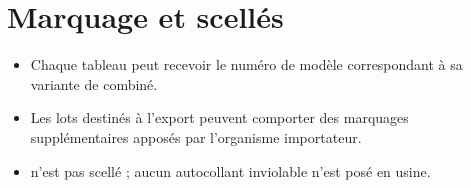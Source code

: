 \chapter{Marquage et scellés}\label{ch:marking}

\begin{itemize}
    \item Chaque tableau peut recevoir le numéro de modèle correspondant à sa variante de combiné.
    \item Les lots destinés à l'export peuvent comporter des marquages supplémentaires apposés par l'organisme importateur.
    \item \ReplicaGenOne{} n'est pas scellé ; aucun autocollant inviolable n'est posé en usine.
\end{itemize}
